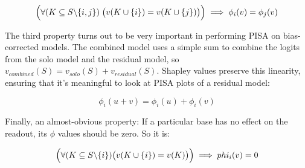 \documentclass{article}
\begin{document}
\begin{equation}
    \Bigl( \forall (K \subseteq S \backslash \{i,j\})\;
    \bigl(v(K \cup \{i\}) = v(K \cup \{j\})\bigr) \Bigr)
    \\
    \implies \phi_i(v) = \phi_j(v)
\end{equation}

The third property turns out to be very important in performing PISA on bias-corrected models.
The combined model uses a simple sum to combine the logits from the solo model and the residual
model, so $v_{combined}(S) = v_{solo}(S) + v_{residual}(S)$.
Shapley values preserve this linearity, ensuring that it's meaningful to look at PISA plots of
a residual model:

\begin{equation}
    \phi_i(u + v) = \phi_i(u) + \phi_i(v)
\end{equation}

Finally, an almost-obvious property: If a particular base has no effect on the readout, its $\phi$
values should be zero. So it is:

\begin{equation}
    \Bigl( \forall (K \subseteq S \backslash \{i\})
    \bigl( v(K \cup \{i\}) = v(K)\bigr)\Bigr)
    \\
    \implies phi_i(v) = 0
\end{equation}
\end{document}
